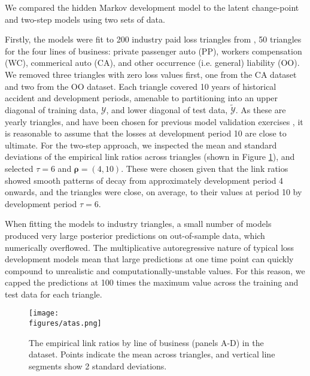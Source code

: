 We compared the hidden Markov development model to
the latent change-point and two-step models 
using two sets of data.

Firstly, the models were fit to 200 industry
paid loss triangles from \cite{meyers2015}, 50 triangles
for the four lines of business: private passenger auto (PP),
workers compensation (WC), commerical auto (CA), and
other occurrence (i.e. general) liability (OO).
We removed three triangles with zero loss values first,
one from the CA dataset and two from the OO dataset.
Each triangle covered 10 years of historical
accident and development periods, amenable to partitioning
into an upper diagonal of training data,
$\mathcal{Y}$, and lower diagonal of test data,
$\tilde{\mathcal{Y}}$.
As these are yearly triangles, and have been
chosen for previous model validation exercises \citep{meyers2015},
it is reasonable to assume that the losses at development
period 10 are close to ultimate.
For the two-step approach, we inspected the
mean and standard deviations of the empirical
link ratios across triangles (shown in Figure
\ref{fig:industry-atas}), and selected
$\tau = 6$ and $\bm{\rho} = (4, 10)$. These
were chosen given
that the link ratios showed smooth patterns
of decay from approximately development period
4 onwards, and the
triangles were close, on average, to their values
at period 10 by development period $\tau = 6$.

When fitting the models to industry triangles,
a small number of models
produced
very large posterior predictions on out-of-sample
data, which numerically overflowed. The multiplicative
autoregressive nature of typical loss development models
mean that large predictions at one
time point can quickly compound to unrealistic and
computationally-unstable values. For this reason,
we capped the predictions at 100 times the
maximum value across the training and test data
for each triangle.

\begin{figure}
    \centering
    \texttt{[image: \\figures/atas.png]}
    \caption{
        The empirical link ratios by line of business 
		(panels A-D) in
        the \cite{meyers2015} dataset.
        Points indicate the mean across triangles,
        and vertical line segments show 2 standard
        deviations.
    }
	\label{fig:industry-atas}
\end{figure}

